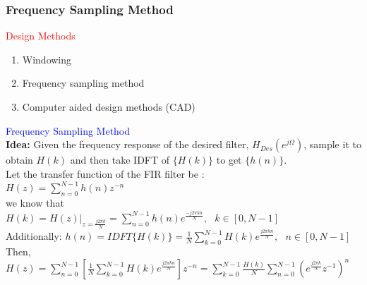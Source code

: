 \documentclass[mathserif, 10pt]{beamer} %
\begin{document}
\frame
{

\small
\frametitle{Frequency Sampling Method}
\textcolor{red}{Design Methods}
\begin{enumerate}
	\item Windowing
	\item Frequency sampling method
	\item Computer aided design methods (CAD)
\end{enumerate}
\textcolor{blue}{Frequency Sampling Method}\\
\textbf{Idea:} Given the frequency response of the desired filter, $H_{Des}(e^{j\Omega})$, sample it to obtain $H(k)$ and then take IDFT of $\{H(k)\}$ to get $\{h(n)\}$. \\ \vspace{.15in}
Let the transfer function of the FIR filter be :\\
$H(z) = \sum\limits_{n=0}^{N-1} h(n) z^{-n}$\\
we know that \\
$H(k) = H(z)|_{z = \frac{j2\pi k}{N}} = \sum\limits_{n=0}^{N-1} h(n) e^{\frac{-j2 \pi kn}{N}}, ~~~k \in [0,N-1]$\\ \vspace{.05in}
Additionally: $h(n) = IDFT \{H(k)\} = \frac{1}{N} \sum\limits_{k=0}^{N-1} H(k) e^{\frac{j2\pi kn}{N}}, ~~~n\in[0,N-1]$\\

Then, \\

$H(z) = \sum\limits_{n=0}^{N-1} \left[ \frac{1}{N}\sum\limits_{k=0}^{N-1} H(k) e^{\frac{j2\pi kn}{N}}\right]z^{-n} = \sum\limits_{k=0}^{N-1} \frac{H(k)}{N}\sum\limits_{n=0}^{N-1}(e^{\frac{j2\pi k}{N}}z^{-1})^n$


}
\end{document}
